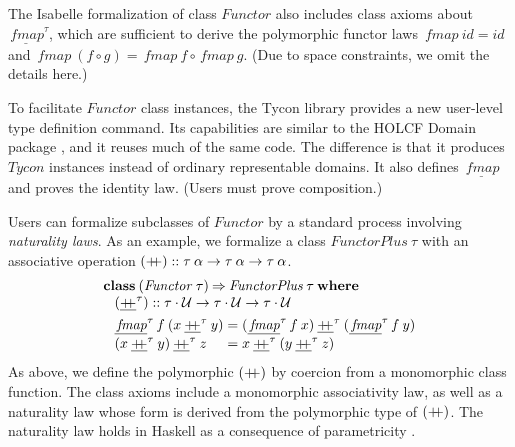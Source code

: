 \documentclass{sigplanconf}
\newcommand{\hsapp}{\mathbin{+\mkern-7mu+}}
\newcommand{\To}{\mathbin{\Rightarrow}}
\newcommand{\U}{\ensuremath{\mathcal{U}}}
\newcommand{\univ}[1]{\ensuremath{\underline{#1}}}
\newcommand{\kwd}[1]{\mathbf{#1}}
\newcommand{\hsc}[1]{\ensuremath{\mathit{#1}}}
\newcommand{\hsid}{\hsc{id}}
\newcommand{\hscoerce}{\hsc{coerce}}
\newcommand{\fmap}{\,\hsc{fmap}} %
\newcommand{\fmapU}{\univ{\fmap}}
\newcommand{\hsappU}{\mathbin{\univ{\hsapp}}}
\newcommand{\tA}{\alpha}
\newcommand{\tT}{\tau}
\theoremstyle{definition}
\begin{document}
The Isabelle formalization of class \hsc{Functor} also includes class axioms about $\fmapU^\tT$, which are sufficient to derive the polymorphic functor laws $\fmap\:\hsid = \hsid$ and $\fmap\:(f \circ g) = \fmap\:f \circ \fmap\:g$. (Due to space constraints, we omit the details here.)

To facilitate \hsc{Functor} class instances, the Tycon library provides a new user-level type definition command. Its capabilities are similar to the HOLCF Domain package \cite{holcf11}, and it reuses much of the same code. The difference is that it produces \hsc{Tycon} instances instead of ordinary representable domains. It also defines $\fmapU$ and proves the identity law. (Users must prove composition.)


Users can formalize subclasses of \hsc{Functor} by a standard process involving \emph{naturality laws}. As an example, we formalize a class $\hsc{FunctorPlus}\:\tT$ with an associative operation $(\hsapp)::\tT\:\tA\to\tT\:\tA\to\tT\:\tA$.
%
\begin{align*}
  & \kwd{class}\:(\hsc{Functor}\:\tT) \To \hsc{FunctorPlus}\:\tT\:\kwd{where}
  \\[-\jot]
  & \hspace{8pt} (\hsappU^\tT) :: \tT\cdot\U \to \tT\cdot\U \to \tT\cdot\U \\
  & \hspace{8pt}
  \begin{alignedat}{2}
    & \fmapU^\tT\,f\:(x \hsappU^\tT y) &&= (\fmapU^\tT\,f\:x) \hsappU^\tT (\fmapU^\tT\,f\:y)
    \\[-\jot]
    & (x \hsappU^\tT y) \hsappU^\tT z &&= x \hsappU^\tT (y \hsappU^\tT z)
  \end{alignedat}
\end{align*}
%
As above, we define the polymorphic $(\hsapp)$ by coercion from a monomorphic class function. The class axioms include a monomorphic associativity law, as well as a naturality law whose form is derived from the polymorphic type of $(\hsapp)$. The naturality law holds in Haskell as a consequence of parametricity \cite{Wadler1989}.
\end{document}
